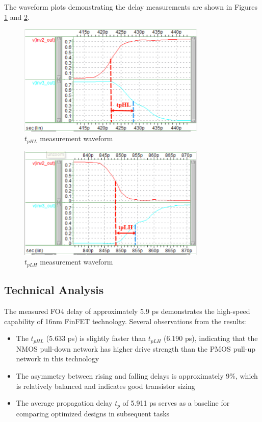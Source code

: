 \documentclass[UTF8,12pt,a4paper]{ctexart}
\begin{document}
The waveform plots demonstrating the delay measurements are shown in Figures \ref{fig:task1_tphl} and \ref{fig:task1_tplh}.

\begin{figure}[h]
\centering
\includegraphics[width=0.8\textwidth]{任务书/image.png}
\caption{$t_{pHL}$ measurement waveform}
\label{fig:task1_tphl}
\end{figure}

\begin{figure}[h]
\centering
\includegraphics[width=0.8\textwidth]{任务书/image-1.png}
\caption{$t_{pLH}$ measurement waveform}
\label{fig:task1_tplh}
\end{figure}

\subsection{Technical Analysis}

The measured FO4 delay of approximately 5.9 ps demonstrates the high-speed capability of 16nm FinFET technology. Several observations from the results:

\begin{itemize}
    \item The $t_{pHL}$ (5.633 ps) is slightly faster than $t_{pLH}$ (6.190 ps), indicating that the NMOS pull-down network has higher drive strength than the PMOS pull-up network in this technology
    \item The asymmetry between rising and falling delays is approximately 9\%, which is relatively balanced and indicates good transistor sizing
    \item The average propagation delay $t_p$ of 5.911 ps serves as a baseline for comparing optimized designs in subsequent tasks
\end{itemize}
\end{document}
